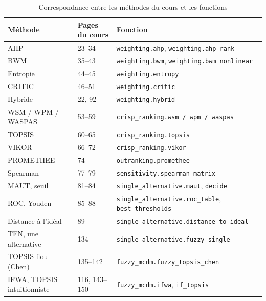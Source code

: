 \documentclass[11pt,a4paper]{report}
\theoremstyle{definition}
\theoremstyle{remark}
\begin{document}
\begin{table}[H]
\centering
\caption{Correspondance entre les méthodes du cours et les fonctions}\label{tab:corresp}
\begin{tabular}{lll}
\toprule
\textbf{Méthode} & \textbf{Pages du cours} & \textbf{Fonction}\\
\midrule
AHP & 23--34 & \texttt{weighting.ahp}, \texttt{weighting.ahp\_rank}\\
BWM & 35--43 & \texttt{weighting.bwm}, \texttt{weighting.bwm\_nonlinear}\\
Entropie & 44--45 & \texttt{weighting.entropy}\\
CRITIC & 46--51 & \texttt{weighting.critic}\\
Hybride & 22, 92 & \texttt{weighting.hybrid}\\
WSM / WPM / WASPAS & 53--59 & \texttt{crisp\_ranking.wsm / wpm / waspas}\\
TOPSIS & 60--65 & \texttt{crisp\_ranking.topsis}\\
VIKOR & 66--72 & \texttt{crisp\_ranking.vikor}\\
PROMETHEE & 74 & \texttt{outranking.promethee}\\
Spearman & 77--79 & \texttt{sensitivity.spearman\_matrix}\\
MAUT, seuil & 81--84 & \texttt{single\_alternative.maut}, \texttt{decide}\\
ROC, Youden & 85--88 & \texttt{single\_alternative.roc\_table}, \texttt{best\_thresholds}\\
Distance à l'idéal & 89 & \texttt{single\_alternative.distance\_to\_ideal}\\
TFN, une alternative & 134 & \texttt{single\_alternative.fuzzy\_single}\\
TOPSIS flou (Chen) & 135--142 & \texttt{fuzzy\_mcdm.fuzzy\_topsis\_chen}\\
IFWA, TOPSIS intuitionniste & 116, 143--150 & \texttt{fuzzy\_mcdm.ifwa}, \texttt{if\_topsis}\\
\bottomrule
\end{tabular}
\end{table}
\end{document}
